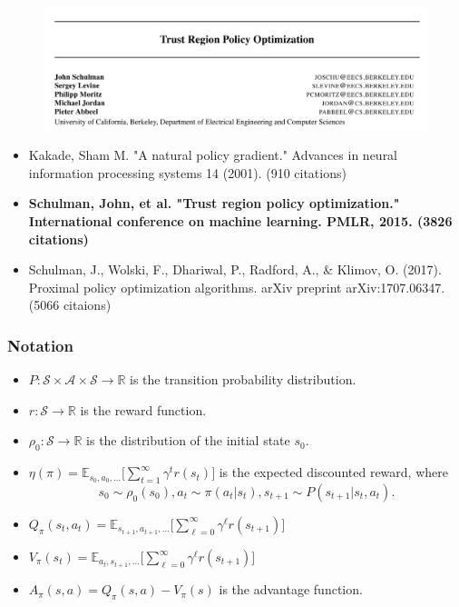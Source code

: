 \documentclass[9pt]{beamer}
\theoremstyle{remark}
\begin{document}
\begin{frame}
\begin{figure}
    \centering
    \includegraphics[width=\textwidth]{figures/paper_title.png}
\end{figure}
\begin{itemize}
    \item Kakade, Sham M. "A natural policy gradient." Advances in neural information processing systems 14 (2001). (910 citations)
    \item \textbf{Schulman, John, et al. "Trust region policy optimization." International conference on machine learning. PMLR, 2015. (3826 citations)}
    \item Schulman, J., Wolski, F., Dhariwal, P., Radford, A., \& Klimov, O. (2017). Proximal policy optimization algorithms. arXiv preprint arXiv:1707.06347. (5066 citaions)
\end{itemize}

\end{frame}

\begin{frame}
    \frametitle{Notation}
    \begin{itemize}
        \item $P: \mathcal{S} \times \mathcal{A} \times \mathcal{S} \rightarrow \mathbb{R}$ is the transition probability distribution.
        \item $r: \mathcal{S} \rightarrow \mathbb{R}$ is the reward function.
        \item $\rho_0: \mathcal{S} \rightarrow \mathbb{R}$ is the distribution of the initial state $s_0$.
        \item $\eta(\pi) = \mathbb{E}_{s_0, a_0, \ldots } \big[ \sum^{\infty}_{t=1} \gamma^{t} r(s_t) \big]$ is the expected discounted reward, where
            \[
                s_0 \sim  \rho_0(s_0), a_t \sim \pi(a_t|s_t), s_{t+1} \sim P(s_{t+1}| s_t, a_t).
            \] 
        \item $Q_\pi(s_t, a_t) = \mathbb{E}_{s_{t+1}, a_{t+1}, \ldots } \big[ \sum^{\infty}_{\ell=0} \gamma^{\ell} r(s_{t+1})\big]$
        \item $V_\pi(s_t) = \mathbb{E}_{a_t, s_{t+1}, \ldots } \big[ \sum^{\infty}_{\ell=0} \gamma^{\ell} r(s_{t+1})\big]$
        \item $A_\pi(s, a) = Q_\pi(s, a) - V_\pi(s)$ is the advantage function.
    \end{itemize}
\end{frame}
\end{document}
